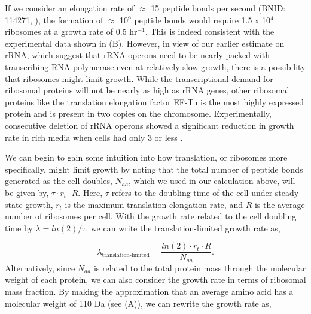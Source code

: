 If we consider an elongation rate of $\approx$ 15 peptide bonds per second
(BNID: 114271, \cite{milo2010, dai2016}), the formation of $\approx$ 10$^9$
peptide bonds would require 1.5 x 10$^4$ ribosomes at a growth rate of 0.5
hr$^{-1}$. This is indeed consistent with the experimental data shown in
(B). However, in view of our  earlier estimate on rRNA,
which suggest that rRNA operons need to be nearly packed with transcribing RNA
polymerase even at relatively slow growth, there is a possibility  that
ribosomes might limit growth. While the transcriptional demand for ribosomal
proteins  will not be nearly as high as rRNA genes, other  ribosomal proteins
like the translation elongation factor EF-Tu is the most highly expressed
protein and is present in two copies on the  chromosome.  Experimentally,
consecutive deletion of rRNA operons showed a significant reduction in growth
rate in rich media when cells had only 3 or less \citep{levin2017}.


We can begin to gain some intuition into how translation, or ribosomes more
specifically, might limit growth by noting that the total number of peptide
bonds generated as the cell doubles, $N_{aa}$, which we used in our calculation
above, will be given by, $\tau \cdot r_t \cdot R$. Here, $\tau$ refers to the
doubling time of the cell under steady-state growth, $r_t$ is the maximum
translation elongation rate, and $R$ is the average number of ribosomes per
cell. With the growth rate related to the cell doubling time by $\lambda =
ln(2)/\tau$, we can write the translation-limited growth rate as,

\begin{equation}
\lambda_{\textrm{translation-limited}} = \frac{ln(2) \cdot r_t \cdot R}{N_{aa}}.
\end{equation}
Alternatively, since $N_{aa}$ is related to the total protein mass through the
molecular weight of each protein, we can also consider the growth rate in terms
of ribosomal mass fraction. By making the approximation that an average amino acid has a molecular weight of 110 Da (see (A)), we can rewrite the growth rate as,

